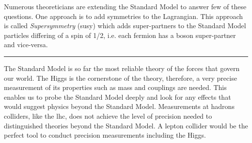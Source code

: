 Numerous theoreticians are extending the Standard Model to answer few of these questions. One approach is to add symmetries to the Lagrangian. This approach is called \textit{Supersymmetry} (\acrshort{susy}) which adds super-partners to the Standard Model particles differing of a spin of 1/2, i.e. each fermion has a boson super-partner and vice-versa.

\begin{center}
\rule{0.5\textwidth}{.4pt}
\end{center}

The Standard Model is so far the most reliable theory of the forces that govern our world. The Higgs is the cornerstone of the theory, therefore, a very precise measurement of its properties such as mass and couplings are needed. This enables us to probe the Standard Model deeply and look for any effects that would suggest physics beyond the Standard Model. Measurements at hadrons colliders, like the \acrlong{lhc}, does not achieve the level of precision needed to distinguished theories beyond the Standard Model. A lepton collider would be the perfect tool to conduct precision measurements including the Higgs.
